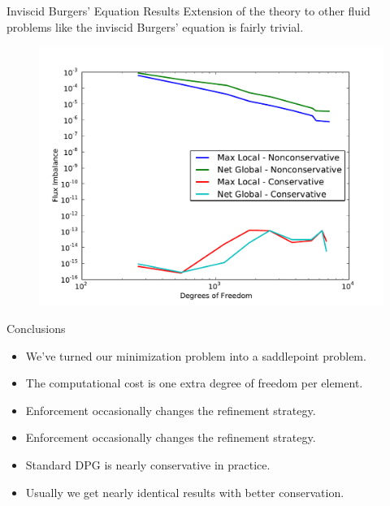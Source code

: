 \documentclass[final]{beamer}
\newlength{\onecolwid}
\begin{document}
\begin{frame}[t]
\begin{columns}[t]
\begin{column}{\onecolwid}
\begin{block}{Inviscid Burgers' Equation Results}
Extension of the theory to other fluid problems like the inviscid Burgers'
equation is fairly trivial.
\begin{figure}
\includegraphics[width=0.8\linewidth]{figs/Burgers/graphFlux.pdf}
\end{figure}


\end{block}


\begin{block}{Conclusions}

\begin{itemize}
  \item We've turned our minimization problem into a saddlepoint problem.
  \item The computational cost is one extra degree of freedom per element.
  \item Enforcement occasionally changes the refinement strategy.
  \item Enforcement occasionally changes the refinement strategy.
  \item Standard DPG is nearly conservative in practice.
  \item Usually we get nearly identical results with better conservation.
\end{itemize}


\end{block}
\end{column}
\end{columns}
\end{frame}
\end{document}
